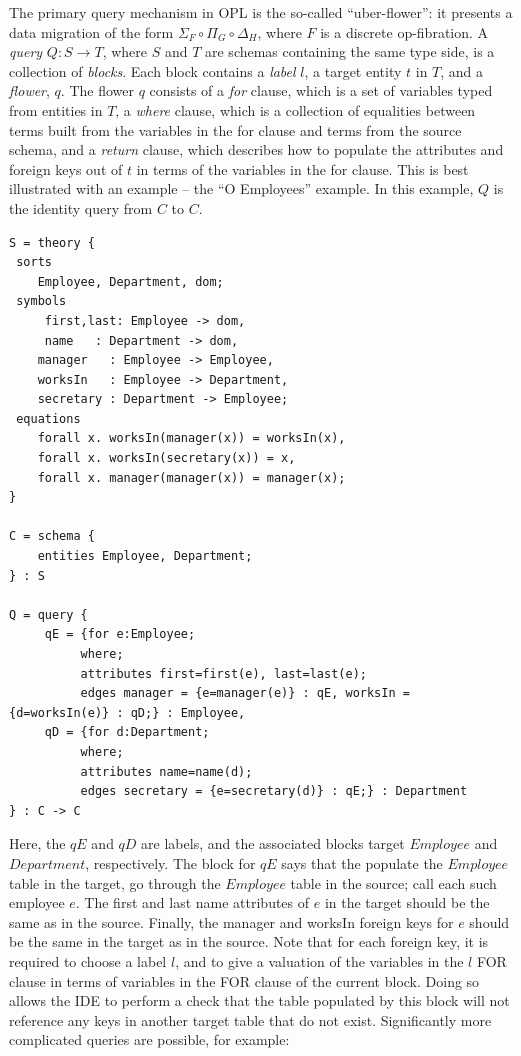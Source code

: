 \documentclass[12pt]{article}
\begin{document}
The primary query mechanism in OPL is the so-called ``uber-flower'': it presents a data migration of the form $\Sigma_F \circ \Pi_G \circ \Delta_H$, where $F$ is a discrete op-fibration.  A {\it query} $Q : S \to T$, where $S$ and $T$ are schemas containing the same type side, is a collection of {\it blocks}.  Each block contains a {\it label} $l$, a target entity $t$ in $T$, and a {\it flower}, $q$.  The flower $q$ consists of a {\it for} clause, which is a set of variables typed from entities in $T$, a {\it where} clause, which is a collection of equalities between terms built from the variables in the for clause and terms from the source schema, and a {\it return} clause, which describes how to populate the attributes and foreign keys out of $t$ in terms of the variables in the for clause.  This is best illustrated with an example -- the ``O Employees'' example.  In this example, $Q$ is the identity query from $C$ to $C$.

\begin{verbatim}
S = theory { 
 sorts
 	Employee, Department, dom;
 symbols
     first,last: Employee -> dom,
     name 	: Department -> dom,
	manager   : Employee -> Employee,
	worksIn   : Employee -> Department,
	secretary : Department -> Employee;
 equations  
  	forall x. worksIn(manager(x)) = worksIn(x),
  	forall x. worksIn(secretary(x)) = x,
  	forall x. manager(manager(x)) = manager(x);
}

C = schema {
	entities Employee, Department;
} : S

Q = query {
	 qE = {for e:Employee; 
	 	  where; 
	 	  attributes first=first(e), last=last(e); 
	 	  edges manager = {e=manager(e)} : qE, worksIn = {d=worksIn(e)} : qD;} : Employee,
	 qD = {for d:Department; 
	 	  where; 
	 	  attributes name=name(d); 
	 	  edges secretary = {e=secretary(d)} : qE;} : Department
} : C -> C
\end{verbatim}

Here, the $qE$ and $qD$ are labels, and the associated blocks target $Employee$ and $Department$, respectively.  The block for $qE$ says that the populate the $Employee$ table in the target, go through the $Employee$ table in the source; call each such employee $e$.  The first and last name attributes of $e$ in the target should be the same as in the source.  Finally, the manager and worksIn foreign keys for $e$ should be the same in the target as in the source.  Note that for each foreign key, it is required to choose a label $l$, and to give a valuation of the variables in the $l$ FOR clause in terms of variables in the FOR clause of the current block.  Doing so allows the IDE to perform a check that the table populated by this block will not reference any keys in another target table that do not exist.  Significantly more complicated queries are possible, for example:
\end{document}
